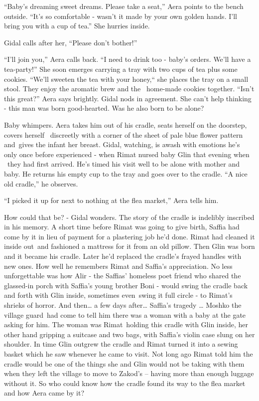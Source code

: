 \documentclass[twoside,11pt]{book}
\begin{document}
``Baby's dreaming sweet dreams. Please take a seat,'' Aera points to the bench
outside{.} ``It's so comfortable - wasn't it made by your own
golden hands. I'll bring you with a cup of tea.'' She hurries inside.

Gidal calls after her, ``Please don't bother!''


\bigskip

``I'll join you,'' Aera calls back. ``I need to drink too - baby's orders. We'll
have a tea-party!'' She soon emerges carrying a tray with two cups of tea plus some cookies.
``We'll sweeten the tea with your honey,``{ }she
places the tray on a small stool. They enjoy the aromatic brew and the \ home-made cookies together.
``Isn't this great?'' Aera says brightly. Gidal nods in agreement. She can't help thinking -
this man was born good-hearted. Was he also born to be alone?

Baby whimpers. Aera takes him out of his cradle, seats herself on the doorstep, covers herself
{\ }discreetly{ }with a corner of the
sheet of pale blue flower pattern and~gives the infant her breast. Gidal, watching, is awash with
emotions{ }he's only once before experienced - when Rimat nursed baby Glin that evening when \ they had
first arrived. He's timed his visit well to be alone with mother and baby. He returns his empty cup to the tray and
goes over to the cradle. ``A nice old cradle,'' he
observes{.}

``I picked it up for next to nothing at the flea market,'' Aera tells
him{.}

How could that be? - Gidal wonders. The story of the cradle is indelibly inscribed in his memory. A short time before
Rimat was going to give birth, Saffia had come by it in lieu of payment for a plastering
job{ }he'd done. Rimat had cleaned it inside out~and fashioned a mattress for
it from an old pillow. Then Glin was born and it became his cradle. Later he'd replaced the cradle's frayed handles
with new ones. How well he remembers Rimat and Saffia's appreciation. No less unforgettable was how Alir - the Saffias'
homeless poet friend who shared the glassed-in porch with Saffia's young brother Boni - would swing the cradle back and
forth with Glin inside, sometimes even~swing it full circle - to Rimat's shrieks of horror. And then{\dots} a few days
after{\dots} Saffia's tragedy {\dots} Moshko the village guard~had come to tell him there was a woman with a baby at
the gate asking for him. The woman was Rimat~holding this cradle with Glin inside, her other hand gripping a suitcase
and two bags, with{ }Saffia's violin case slung on her shoulder. In time Glin
outgrew the cradle and Rimat turned it into a sewing basket which he saw whenever he came to visit. Not long ago Rimat
told him the cradle would be one of the things she and Glin would not be taking with them when they left the village to
move to Zakod's {{}--} having more than enough luggage without it. So who could
know how the cradle found its way to the flea market and how Aera came by it?
\end{document}

